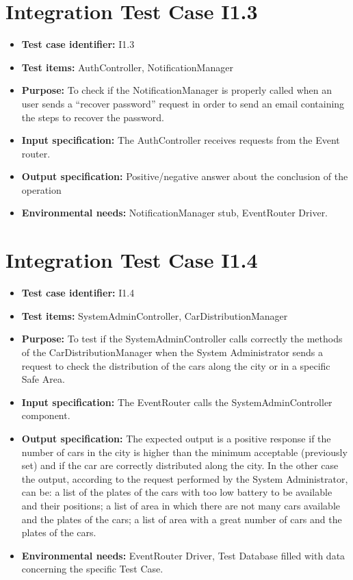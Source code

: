 \section{Integration Test Case I1.3}
\begin{itemize}
\item \textbf{Test case identifier:} I1.3
\item \textbf{Test items:} AuthController, NotificationManager
\item \textbf{Purpose:} To check if the NotificationManager is properly called when an user sends a “recover password” request in order to send an email containing the steps to recover the password.
\item \textbf{Input specification:} The AuthController receives requests from the Event router.
\item \textbf{Output specification:} Positive/negative answer about the conclusion of the operation
\item \textbf{Environmental needs:} NotificationManager stub,  EventRouter Driver.
\end{itemize}

\section{Integration Test Case I1.4}
\begin{itemize}
\item \textbf{Test case identifier:} I1.4
\item \textbf{Test items:} SystemAdminController, CarDistributionManager
\item \textbf{Purpose:} To test if the SystemAdminController calls correctly the methods of the CarDistributionManager when the System Administrator sends a request to check the distribution of the cars along the city or in a specific Safe Area.
\item \textbf{Input specification:} The EventRouter calls the SystemAdminController component.
\item \textbf{Output specification:} The expected output is a positive response if the number of cars in the city is higher than the minimum acceptable (previously set) and if the car are correctly distributed along the city. In the other case the output, according to the request performed by the System Administrator, can be: a list of the plates of the cars with too low battery to be available and their positions; a list of area in which there are not many cars available and the plates of the cars; a list of area with a great number of cars and the plates of the cars.
\item \textbf{Environmental needs:} EventRouter Driver,  Test Database filled with data concerning the specific Test Case.
\end{itemize}

